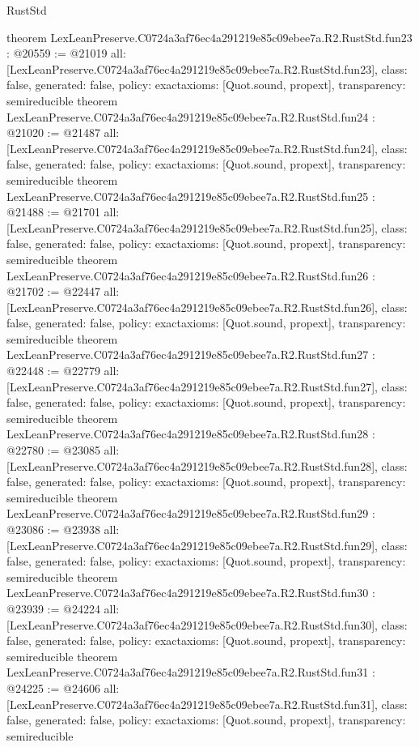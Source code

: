 \begin{lexlean}{RustStd}
\begin{coremodule}
{}
theorem LexLeanPreserve.C0724a3af76ec4a291219e85c09ebee7a.R2.RustStd.fun23 : @20559 := @21019 {
  all: [LexLeanPreserve.C0724a3af76ec4a291219e85c09ebee7a.R2.RustStd.fun23],
  class: false,
  generated: false,
  policy: exact{axioms: [Quot.sound, propext]},
  transparency: semireducible
}
theorem LexLeanPreserve.C0724a3af76ec4a291219e85c09ebee7a.R2.RustStd.fun24 : @21020 := @21487 {
  all: [LexLeanPreserve.C0724a3af76ec4a291219e85c09ebee7a.R2.RustStd.fun24],
  class: false,
  generated: false,
  policy: exact{axioms: [Quot.sound, propext]},
  transparency: semireducible
}
theorem LexLeanPreserve.C0724a3af76ec4a291219e85c09ebee7a.R2.RustStd.fun25 : @21488 := @21701 {
  all: [LexLeanPreserve.C0724a3af76ec4a291219e85c09ebee7a.R2.RustStd.fun25],
  class: false,
  generated: false,
  policy: exact{axioms: [Quot.sound, propext]},
  transparency: semireducible
}
theorem LexLeanPreserve.C0724a3af76ec4a291219e85c09ebee7a.R2.RustStd.fun26 : @21702 := @22447 {
  all: [LexLeanPreserve.C0724a3af76ec4a291219e85c09ebee7a.R2.RustStd.fun26],
  class: false,
  generated: false,
  policy: exact{axioms: [Quot.sound, propext]},
  transparency: semireducible
}
theorem LexLeanPreserve.C0724a3af76ec4a291219e85c09ebee7a.R2.RustStd.fun27 : @22448 := @22779 {
  all: [LexLeanPreserve.C0724a3af76ec4a291219e85c09ebee7a.R2.RustStd.fun27],
  class: false,
  generated: false,
  policy: exact{axioms: [Quot.sound, propext]},
  transparency: semireducible
}
theorem LexLeanPreserve.C0724a3af76ec4a291219e85c09ebee7a.R2.RustStd.fun28 : @22780 := @23085 {
  all: [LexLeanPreserve.C0724a3af76ec4a291219e85c09ebee7a.R2.RustStd.fun28],
  class: false,
  generated: false,
  policy: exact{axioms: [Quot.sound, propext]},
  transparency: semireducible
}
theorem LexLeanPreserve.C0724a3af76ec4a291219e85c09ebee7a.R2.RustStd.fun29 : @23086 := @23938 {
  all: [LexLeanPreserve.C0724a3af76ec4a291219e85c09ebee7a.R2.RustStd.fun29],
  class: false,
  generated: false,
  policy: exact{axioms: [Quot.sound, propext]},
  transparency: semireducible
}
theorem LexLeanPreserve.C0724a3af76ec4a291219e85c09ebee7a.R2.RustStd.fun30 : @23939 := @24224 {
  all: [LexLeanPreserve.C0724a3af76ec4a291219e85c09ebee7a.R2.RustStd.fun30],
  class: false,
  generated: false,
  policy: exact{axioms: [Quot.sound, propext]},
  transparency: semireducible
}
theorem LexLeanPreserve.C0724a3af76ec4a291219e85c09ebee7a.R2.RustStd.fun31 : @24225 := @24606 {
  all: [LexLeanPreserve.C0724a3af76ec4a291219e85c09ebee7a.R2.RustStd.fun31],
  class: false,
  generated: false,
  policy: exact{axioms: [Quot.sound, propext]},
  transparency: semireducible
}
\end{coremodule}
\end{lexlean}
